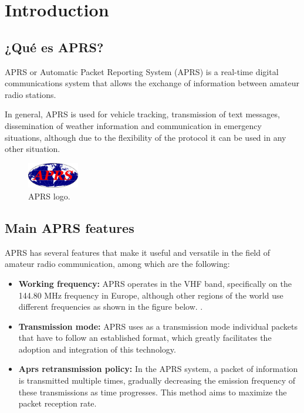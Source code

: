 \chapter*{Introduction}
\label{cap:introduction}

\section{¿Qué es APRS?}

APRS or Automatic Packet Reporting System (APRS) is a real-time digital communications system that allows the exchange of information between amateur radio stations.

In general, APRS is used for vehicle tracking, transmission of text messages, dissemination of weather information and communication in emergency situations, although due to the flexibility of the protocol it can be used in any other situation.

\begin{figure}[h!]
	\centering
	\includegraphics[width=0.2\textwidth]{Imagenes/Chapter_1/APRS_logo.png}
	\caption{APRS logo.}
	\label{fig:aprs-logo}
\end{figure}

\section{Main APRS features}

APRS has several features that make it useful and versatile in the field of amateur radio communication, among which are the following:
\begin{itemize}
	\item \textbf{Working frequency:} APRS operates in the VHF band, specifically on the 144.80 MHz frequency in Europe, although other regions of the world use different frequencies as shown in the figure below. .
	\item \textbf{Transmission mode:} APRS uses as a transmission mode individual packets that have to follow an established format, which greatly facilitates the adoption and integration of this technology.
	\item \textbf{Aprs retransmission policy:} In the APRS system, a packet of information is transmitted multiple times, gradually decreasing the emission frequency of these transmissions as time progresses. This method aims to maximize the packet reception rate.
\end{itemize}

